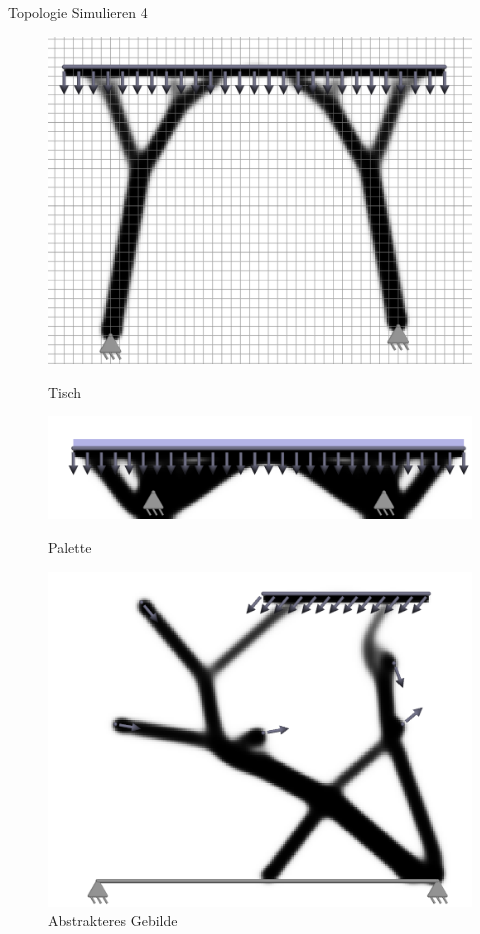 \documentclass{beamer}
\begin{document}
\begin{frame}{Topologie Simulieren 4}
\begin{figure}[H]
    \begin{minipage}{0.25\textwidth}
        \centering
        \includegraphics[width=\linewidth]{figures/tisch.png}
        \caption{Tisch}
    \end{minipage}\hfill
    \begin{minipage}{0.25\textwidth}
        \centering
        \includegraphics[width=\linewidth]{figures/Palette.png}
        \caption{Palette}
    \end{minipage}\hfill
    \begin{minipage}{0.25\textwidth}
        \centering
        \includegraphics[width=\linewidth]{figures/abstrakt.png}
        \caption{Abstrakteres Gebilde}
    \end{minipage}
\end{figure}
\end{frame}
\end{document}
